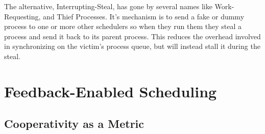 The alternative, Interrupting-Steal, has gone by several names like 
Work-Requesting, and Thief Processes. It's mechanism is to send a fake or 
dummy process to one or more other schedulers so when they run them they steal
a process and send it back to its parent process. This reduces the overhead 
involved in synchronizing on the victim's process queue, but will instead stall
it during the steal.


\section{Feedback-Enabled Scheduling}


\subsection{Cooperativity as a Metric}



